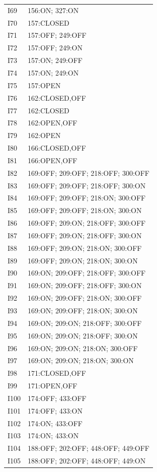 {\begin{longtable}{lp{.85\linewidth}}
I69 & 156:ON; 327:ON \\
I70 & 157:CLOSED \\
I71 & 157:OFF; 249:OFF \\
I72 & 157:OFF; 249:ON \\
I73 & 157:ON; 249:OFF \\
I74 & 157:ON; 249:ON \\
I75 & 157:OPEN \\
I76 & 162:CLOSED,OFF \\
I77 & 162:CLOSED \\
I78 & 162:OPEN,OFF \\
I79 & 162:OPEN \\
I80 & 166:CLOSED,OFF \\
I81 & 166:OPEN,OFF \\
I82 & 169:OFF; 209:OFF; 218:OFF; 300:OFF \\
I83 & 169:OFF; 209:OFF; 218:OFF; 300:ON \\
I84 & 169:OFF; 209:OFF; 218:ON; 300:OFF \\
I85 & 169:OFF; 209:OFF; 218:ON; 300:ON \\
I86 & 169:OFF; 209:ON; 218:OFF; 300:OFF \\
I87 & 169:OFF; 209:ON; 218:OFF; 300:ON \\
I88 & 169:OFF; 209:ON; 218:ON; 300:OFF \\
I89 & 169:OFF; 209:ON; 218:ON; 300:ON \\
I90 & 169:ON; 209:OFF; 218:OFF; 300:OFF \\
I91 & 169:ON; 209:OFF; 218:OFF; 300:ON \\
I92 & 169:ON; 209:OFF; 218:ON; 300:OFF \\
I93 & 169:ON; 209:OFF; 218:ON; 300:ON \\
I94 & 169:ON; 209:ON; 218:OFF; 300:OFF \\
I95 & 169:ON; 209:ON; 218:OFF; 300:ON \\
I96 & 169:ON; 209:ON; 218:ON; 300:OFF \\
I97 & 169:ON; 209:ON; 218:ON; 300:ON \\
I98 & 171:CLOSED,OFF \\
I99 & 171:OPEN,OFF \\
I100 & 174:OFF; 433:OFF \\
I101 & 174:OFF; 433:ON \\
I102 & 174:ON; 433:OFF \\
I103 & 174:ON; 433:ON \\
I104 & 188:OFF; 202:OFF; 448:OFF; 449:OFF \\
I105 & 188:OFF; 202:OFF; 448:OFF; 449:ON \\

\end{longtable}}
